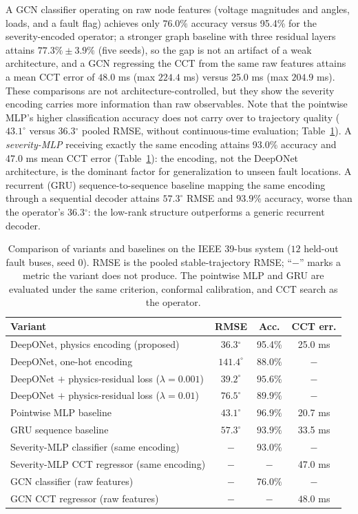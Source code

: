 \documentclass[5p,times]{elsarticle}
\newcommand{\rmseAll}{36.3}           %
\newcommand{\pctACC}{95.4\%}          %
\newcommand{\ccterr}{25.0}            %
\newcommand{\sevMLPacc}{93.0\%}       %
\newcommand{\sevMLPcct}{47.0}         %
\newcommand{\mlpcct}{20.7}            %
\newcommand{\grucct}{33.5}            %
\begin{document}
A GCN classifier operating on raw node features (voltage magnitudes and angles, loads, and a
fault flag) achieves only $76.0\%$ accuracy versus \pctACC{} for the severity-encoded operator;
a stronger graph baseline with three residual layers attains
$77.3\%\pm3.9\%$ (five seeds), so the gap is not an artifact of a weak architecture, and a
GCN regressing the CCT from the same raw features attains a mean CCT error of $48.0$ ms (max
$224.4$ ms) versus \ccterr{} ms (max $204.9$ ms). These comparisons are not
architecture-controlled, but
they show the severity encoding carries more information than raw observables. Note that the
pointwise MLP's higher classification accuracy does not carry over to trajectory quality
($43.1^\circ$ versus \rmseAll{}$^\circ$ pooled RMSE, without continuous-time evaluation;
Table~\ref{tab:ablation}). A \emph{severity-MLP}
receiving exactly the same encoding attains \sevMLPacc{} accuracy and \sevMLPcct{} ms mean CCT
error (Table~\ref{tab:ablation}): the encoding, not the DeepONet architecture, is the dominant
factor for generalization to unseen fault locations. A recurrent (GRU) sequence-to-sequence
baseline mapping the same encoding through a sequential decoder attains $57.3^\circ$ RMSE and
$93.9\%$ accuracy, worse than the operator's \rmseAll{}$^\circ$: the low-rank structure
outperforms a generic recurrent decoder.

\begin{table}[t]
\centering
\caption{Comparison of variants and baselines on the IEEE 39-bus system ($12$ held-out fault
buses, seed 0). RMSE is the pooled stable-trajectory RMSE; ``$-$'' marks a metric the variant does
not produce. The pointwise MLP and GRU are evaluated under the same criterion, conformal
calibration, and CCT search as the operator.}
\label{tab:ablation}
\begin{tabular}{lccc}
\toprule
Variant & RMSE & Acc. & CCT err. \\
\midrule
DeepONet, physics encoding (proposed) & \rmseAll{}$^\circ$ & \pctACC{} & \ccterr{} ms \\
DeepONet, one-hot encoding & $141.4^\circ$ & $88.0\%$ & $-$ \\
DeepONet $+$ physics-residual loss ($\lambda{=}0.001$) & $39.2^\circ$ & $95.6\%$ & $-$ \\
DeepONet $+$ physics-residual loss ($\lambda{=}0.01$) & $76.5^\circ$ & $89.9\%$ & $-$ \\
Pointwise MLP baseline & $43.1^\circ$ & $96.9\%$ & \mlpcct{} ms \\
GRU sequence baseline & $57.3^\circ$ & $93.9\%$ & \grucct{} ms \\
Severity-MLP classifier (same encoding) & $-$ & \sevMLPacc{} & $-$ \\
Severity-MLP CCT regressor (same encoding) & $-$ & $-$ & \sevMLPcct{} ms \\
GCN classifier (raw features) & $-$ & $76.0\%$ & $-$ \\
GCN CCT regressor (raw features) & $-$ & $-$ & $48.0$ ms \\
\bottomrule
\end{tabular}
\end{table}
\end{document}

